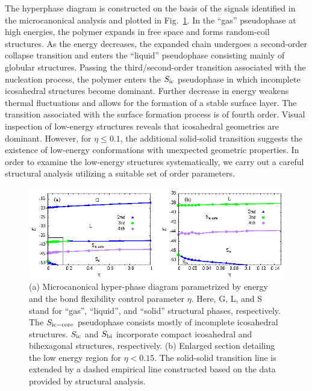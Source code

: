 \documentclass[12pt]{report}
\begin{document}
The hyperphase diagram is constructed on the basis of
the signals identified in the microcanonical analysis and plotted in
Fig.~\ref{phase_diagram}. 
In the ``gas'' pseudophase at high energies,
the polymer expands in free space and forms random-coil structures. As
the energy decreases, the expanded chain undergoes a second-order
collapse transition and enters the ``liquid'' pseudophase consisting
mainly of globular structures. Passing the third/second-order
transition associated with the nucleation process, the polymer enters
the $S_{\rm ic}$ pseudophase in which incomplete icosahedral structures
become dominant. Further decrease in energy weakens thermal fluctuations
and allows for the formation of a stable surface layer. The transition
associated with the surface formation process 
is of fourth order. Visual inspection of low-energy structures reveals
that icosahedral geometries are dominant. However, for $\eta \leq 0.1$,
the additional solid-solid transition suggests the existence of
low-energy conformations with unexpected geometric properties.
In order to examine the low-energy structures systematically, we
carry out a careful structural analysis utilizing a suitable set of
order parameters.
%
\begin{figure}
\begin{center}
    \includegraphics[width=\textwidth]{chapter6Figs/Fig3.eps}%
    \caption{\label{phase_diagram} 
    (a) Microcanonical hyper-phase diagram parametrized by energy and
the bond flexibility control parameter $\eta$. Here, G, L, and S stand
for ``gas'', ``liquid'', and ``solid'' structural phases, respectively.
The $S_{\rm ic-core}$ pseudophase consists mostly of incomplete
icosahedral structures. $S_{\rm ic}$ and $S_{\rm bi}$ incorporate
compact icosahedral and bihexagonal structures, respectively. (b)
Enlarged section detailing the low energy region for $\eta < 0.15$. The
solid-solid transition line is extended by a dashed empirical line
constructed based on the data provided by structural analysis.}
\end{center}
\end{figure}
%
\end{document}
